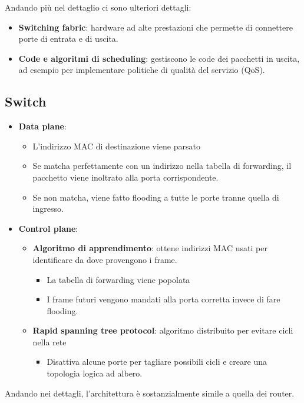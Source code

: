 Andando più nel dettaglio ci sono ulteriori dettagli:
\begin{itemize}
	\item \textbf{Switching fabric}: hardware ad alte prestazioni che permette di connettere porte di entrata e di uscita.
	\item \textbf{Code e algoritmi di scheduling}: gestiscono le code dei pacchetti in uscita, ad esempio per implementare politiche di qualità del servizio (QoS).
\end{itemize}
\subsection{Switch}
\begin{itemize}
	\item \textbf{Data plane}:
	\begin{itemize}
		\item L'indirizzo MAC di destinazione viene parsato
		\item Se matcha perfettamente con un indirizzo nella tabella di forwarding, il pacchetto viene inoltrato alla porta corrispondente.
		\item Se non matcha, viene fatto flooding a tutte le porte tranne quella di ingresso.
	\end{itemize}
	\item \textbf{Control plane}:
	\begin{itemize}
		\item \textbf{Algoritmo di apprendimento}: ottene indirizzi MAC usati per identificare da dove provengono i frame.
		\begin{itemize}
			\item La tabella di forwarding viene popolata 
			\item I frame futuri vengono mandati alla porta corretta invece di fare flooding.
		\end{itemize}
		\item \textbf{Rapid spanning tree protocol}: algoritmo distribuito per evitare cicli nella rete
		\begin{itemize}
			\item Disattiva alcune porte per tagliare possibili cicli e creare una topologia logica ad albero.
		\end{itemize}
	\end{itemize}
\end{itemize}
Andando nei dettagli, l'architettura è sostanzialmente simile a quella dei router.
